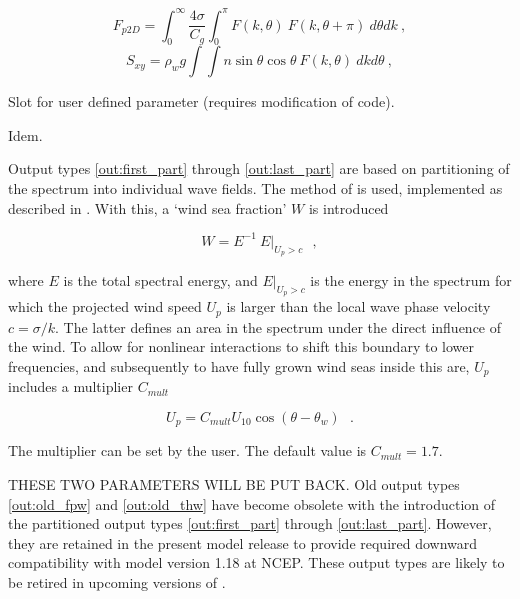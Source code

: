 \begin{list}{)\hfill}
      \begin{equation} F_{p2D} = \int_0^{\infty} \frac{4 \sigma}{C_g} \int_0^{\pi}  F(k,\theta) \:  F(k,\theta+\pi) \:  d\theta dk
      \: , \label{eq:Sxx} \end{equation}
      \begin{equation} S_{xy} =\rho_w g \int \!\!\!\! \int
        n \sin \theta \cos \theta  \: F(k,\theta) \: dk d\theta
      \: , \label{eq:Syy} \end{equation}
\item Slot for user defined parameter (requires modification of code).
\item Idem.
\end{list}

\noindent
Output types \ref{out:first_part} through \ref{out:last_part} are based on
partitioning of the spectrum into individual wave fields. The method of
\cite{art:HP01} is used, implemented as described in \cite{tol:Oahu07a}. With
this, a `wind sea fraction' $W$ is introduced

\begin{equation}
W = E^{-1}  \: E |_{U_p > c}  \:\:\: , \label{eq:wsf}
\end{equation}

\noindent
where $E$ is the total spectral energy, and $E |_{U_p > c}$ is the energy in
the spectrum for which the projected wind speed $U_p$ is larger than the local
wave phase velocity $c = \sigma / k$. The latter defines an area in the
spectrum under the direct influence of the wind. To allow for nonlinear
interactions to shift this boundary to lower frequencies, and subsequently to
have fully grown wind seas inside this are, $U_p$ includes a multiplier
$C_{mult}$

\begin{equation}
U_p = C_{mult} U_{10} \cos ( \theta - \theta_w )  \:\:\: . \label{eq:Up}
\end{equation}

\noindent
The multiplier can be set by the user. The default value is $C_{mult} = 1.7$.

THESE TWO PARAMETERS WILL BE PUT BACK. 
Old output types \ref{out:old_fpw} and \ref{out:old_thw} have become obsolete
with the introduction of the partitioned output types \ref{out:first_part}
through \ref{out:last_part}. However, they are retained in the present model
release to provide required downward compatibility with model version 1.18 at
NCEP. These output types are likely to be retired in upcoming versions of \ws.

